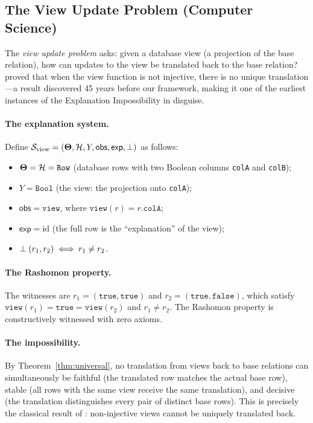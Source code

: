 \subsection{The View Update Problem (Computer Science)}
\label{sec:instance-view-update}

The \emph{view update problem} asks: given a database view (a projection of
the base relation), how can updates to the view be translated back to the
base relation?  \citet{bancilhon1981update} proved that when the view function
is not injective, there is no unique translation---a result discovered 45
years before our framework, making it one of the earliest instances of
the Explanation Impossibility in disguise.

\paragraph{The explanation system.}
Define $\mathcal{S}_{\mathrm{view}} = (\mathbf{\Theta}, \mathcal{H}, Y, \mathsf{obs},
\mathsf{exp}, \perp)$ as follows:
\begin{itemize}
  \item $\mathbf{\Theta} = \mathcal{H} = \texttt{Row}$ (database rows with two Boolean columns
    \texttt{colA} and \texttt{colB});
  \item $Y = \texttt{Bool}$ (the view: the projection onto \texttt{colA});
  \item $\mathsf{obs} = \texttt{view}$, where $\texttt{view}(r) = r.\texttt{colA}$;
  \item $\mathsf{exp} = \mathrm{id}$ (the full row is the ``explanation'' of
    the view);
  \item $\perp(r_1, r_2) \iff r_1 \ne r_2$.
\end{itemize}

\paragraph{The Rashomon property.}
The witnesses are $r_1 = (\mathtt{true}, \mathtt{true})$ and
$r_2 = (\mathtt{true}, \mathtt{false})$, which satisfy
$\texttt{view}(r_1) = \mathtt{true} = \texttt{view}(r_2)$ and
$r_1 \ne r_2$.  The Rashomon property is constructively witnessed with
zero axioms.

\paragraph{The impossibility.}
By Theorem~\ref{thm:universal}, no translation from views back to base
relations can simultaneously be faithful (the translated row matches the
actual base row), stable (all rows with the same view receive the same
translation), and decisive (the translation distinguishes every pair of
distinct base rows).  This is precisely the classical result of
\citet{bancilhon1981update}: non-injective views cannot be uniquely
translated back.

